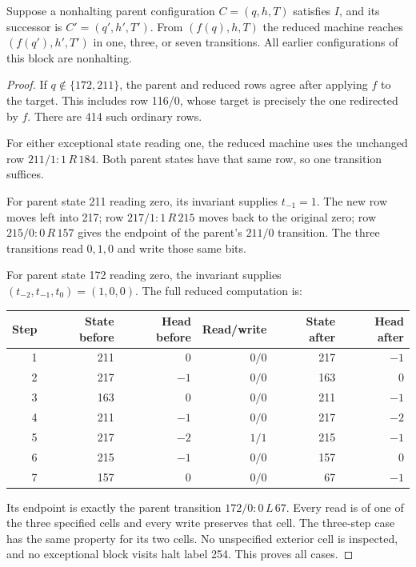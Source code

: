 \begin{lemma}
\label{lem:local208-replacement}
Suppose a nonhalting parent configuration $C=(q,h,T)$ satisfies $I$,
and its successor is $C'=(q',h',T')$. From $(f(q),h,T)$ the reduced machine
reaches $(f(q'),h',T')$ in one, three, or seven transitions. All earlier
configurations of this block are nonhalting.
\end{lemma}
\begin{proof}
If $q\notin\{172,211\}$, the parent and reduced rows agree after applying
$f$ to the target. This includes row 116/0, whose target is precisely the
one redirected by $f$. There are 414 such ordinary rows.

For either exceptional state reading one, the reduced machine uses the
unchanged row $211/1:1\,R\,184$. Both parent states have that same row,
so one transition suffices.

For parent state 211 reading zero, its invariant supplies $t_{-1}=1$.
The new row moves left into 217; row $217/1:1\,R\,215$ moves back to
the original zero; row $215/0:0\,R\,157$ gives the endpoint of the
parent's $211/0$ transition. The three transitions read $0,1,0$ and write
those same bits.

For parent state 172 reading zero, the invariant supplies
$(t_{-2},t_{-1},t_0)=(1,0,0)$. The full reduced computation is:
\begin{center}
\begin{tabular}{rrrrrr}
\toprule
Step & State before & Head before & Read/write & State after & Head after\\
\midrule
1 & 211 & $0$  & $0/0$ & 217 & $-1$\\
2 & 217 & $-1$ & $0/0$ & 163 & $0$\\
3 & 163 & $0$  & $0/0$ & 211 & $-1$\\
4 & 211 & $-1$ & $0/0$ & 217 & $-2$\\
5 & 217 & $-2$ & $1/1$ & 215 & $-1$\\
6 & 215 & $-1$ & $0/0$ & 157 & $0$\\
7 & 157 & $0$  & $0/0$ & 67  & $-1$\\
\bottomrule
\end{tabular}
\end{center}
Its endpoint is exactly the parent transition $172/0:0\,L\,67$.
Every read is of one of the three specified cells and every write preserves
that cell. The three-step case has the same property for its two cells.
No unspecified exterior cell is inspected, and no exceptional block visits
halt label 254. This proves all cases.
\end{proof}

